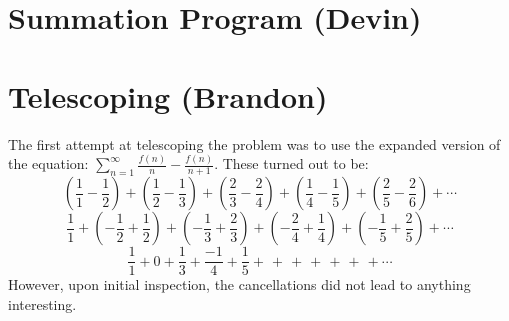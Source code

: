 \documentclass{article}
\begin{document}
\section{Summation Program (Devin)}

\section{Telescoping (Brandon)}
The first attempt at telescoping the problem was to use the expanded version of the equation: $\sum_{n=1}^\infty \frac{f(n)}{n} - \frac{f(n)}{n+1}$. These turned out to be:\\
$$\left(\frac{1}{1}-\frac{1}{2}\right)+\left(\frac{1}{2}-\frac{1}{3}\right)+\left(\frac{2}{3}-\frac{2}{4}\right)+\left(\frac{1}{4}-\frac{1}{5}\right)+\left(\frac{2}{5}-\frac{2}{6}\right)+\cdots$$
$$\frac{1}{1} + \left(-\frac{1}{2}+\frac{1}{2}\right) + \left(-\frac{1}{3}+\frac{2}{3}\right) +\left(-\frac{2}{4}+\frac{1}{4}\right)+\left(-\frac{1}{5}+\frac{2}{5}\right)+\cdots$$
$$\frac{1}{1}+0+\frac{1}{3}+\frac{-1}{4}+\frac{1}{5}+\frac{}{}+\frac{}{}+\frac{}{}+\frac{}{}+\frac{}{}+\frac{}{}+\cdots$$
However, upon initial inspection, the cancellations did not lead to anything interesting.
\end{document}

